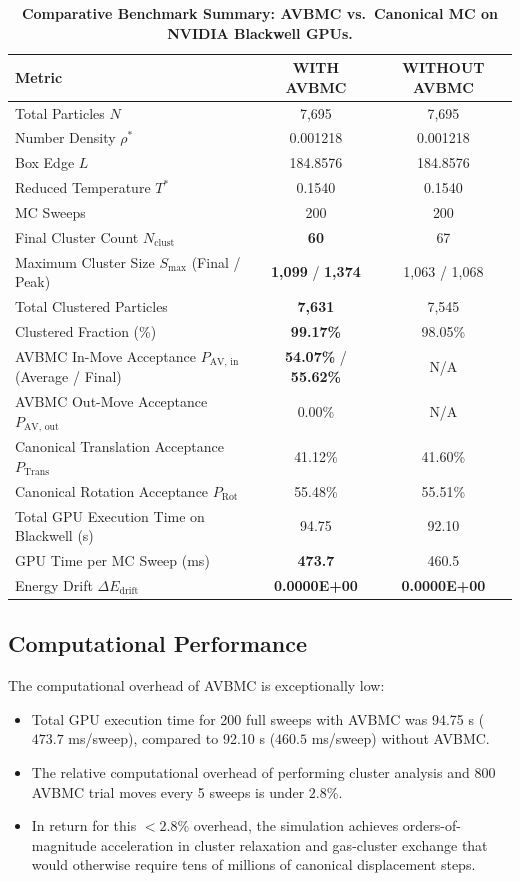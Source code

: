 \documentclass[11pt,a4paper]{article}
\begin{document}
\begin{table}[h!]
\centering
\caption{\textbf{Comparative Benchmark Summary: AVBMC vs.\ Canonical MC on NVIDIA Blackwell GPUs.}}
\label{tab:comparison}
\vspace{0.5em}
\begin{tabularx}{\textwidth}{X c c}
\toprule
\textbf{Metric} & \textbf{WITH AVBMC} & \textbf{WITHOUT AVBMC} \\
\midrule
Total Particles $N$ & 7,695 & 7,695 \\
Number Density $\rho^*$ & 0.001218 & 0.001218 \\
Box Edge $L$ & 184.8576 & 184.8576 \\
Reduced Temperature $T^*$ & 0.1540 & 0.1540 \\
MC Sweeps & 200 & 200 \\
\midrule
Final Cluster Count $N_{\text{clust}}$ & \textbf{60} & 67 \\
Maximum Cluster Size $S_{\max}$ (Final / Peak) & \textbf{1,099} / \textbf{1,374} & 1,063 / 1,068 \\
Total Clustered Particles & \textbf{7,631} & 7,545 \\
Clustered Fraction (\%) & \textbf{99.17\%} & 98.05\% \\
AVBMC In-Move Acceptance $P_{\text{AV, in}}$ (Average / Final) & \textbf{54.07\%} / \textbf{55.62\%} & N/A \\
AVBMC Out-Move Acceptance $P_{\text{AV, out}}$ & 0.00\% & N/A \\
Canonical Translation Acceptance $P_{\text{Trans}}$ & 41.12\% & 41.60\% \\
Canonical Rotation Acceptance $P_{\text{Rot}}$ & 55.48\% & 55.51\% \\
\midrule
Total GPU Execution Time on Blackwell (s) & 94.75 & 92.10 \\
GPU Time per MC Sweep (ms) & \textbf{473.7} & 460.5 \\
Energy Drift $\Delta E_{\text{drift}}$ & \textbf{0.0000E+00} & \textbf{0.0000E+00} \\
\bottomrule
\end{tabularx}
\end{table}

\subsection{Computational Performance}
The computational overhead of AVBMC is exceptionally low:
\begin{itemize}
    \item Total GPU execution time for 200 full sweeps with AVBMC was 94.75 s ($473.7$ ms/sweep), compared to 92.10 s ($460.5$ ms/sweep) without AVBMC.
    \item The relative computational overhead of performing cluster analysis and 800 AVBMC trial moves every 5 sweeps is under $\mathbf{2.8\%}$.
    \item In return for this $< 2.8\%$ overhead, the simulation achieves orders-of-magnitude acceleration in cluster relaxation and gas-cluster exchange that would otherwise require tens of millions of canonical displacement steps.
\end{itemize}
\end{document}
